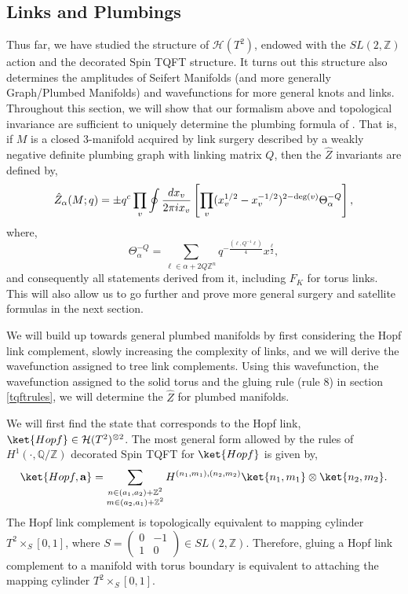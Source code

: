 \documentclass{article}
\newcommand{\Z}{{\mathbb Z}}
\newcommand{\Q}{{\mathbb Q}}
\def\be{\begin{equation}}
\def\ee{\end{equation}}
\numberwithin{corollary}{theorem}
\numberwithin{corollary}{proposition}
\begin{document}
\subsection{Links and Plumbings}
Thus far, we have studied the structure of $\mathcal{H}(T^2)$, endowed with the $SL(2,\mathbb{Z})$ action and the decorated $\mathrm{Spin}$ TQFT structure. It turns out this structure also determines the amplitudes of Seifert Manifolds (and more generally Graph/Plumbed Manifolds) and wavefunctions for more general knots and links. Throughout this section, we will show that our formalism above and topological invariance are sufficient to uniquely determine the plumbing formula of \cite{GPPV}. That is, if $M$ is a closed 3-manifold acquired by link surgery described by a weakly negative definite plumbing graph with linking matrix $Q$, then the $\hat{Z}$ invariants are defined by, 
\be \label{plumbingformula}\Hat{Z}_\alpha(M;q) = \pm q^c \prod_v\oint \frac{dx_v}{2\pi i x_v} \left[ \prod_v (x_v^{1/2} -x_v^{-1/2})^{2-\mathrm{deg}( v)} \Theta^{-Q}_\alpha  \right], \ee
where,
$$\Theta^{-Q}_\alpha = \sum_{\ell \in \alpha + 2Q\mathbb{Z}^n} q^{-\frac{( \ell,Q^{-1} \ell)}{4}} x^{\frac{\ell}{2}},$$
and consequently all statements derived from it, including $F_K$ for torus links. This will also allow us to go further and prove more general surgery and satellite formulas in the next section. 

We will build up towards general plumbed manifolds by first considering the Hopf link complement, slowly increasing the complexity of links, and we will derive the wavefunction assigned to tree link complements. Using this wavefunction, the wavefunction assigned to the solid torus and the gluing rule (rule 8) in section \ref{tqftrules}, we will determine the $\hat{Z}$ for plumbed manifolds. 

We will first find the state that corresponds to the Hopf link, $\ket{Hopf}\in \mathcal{H}(T^2)^{\otimes2}$. The most general form allowed by the rules of $H^{1}(\cdot,\Q/\Z)$ decorated $\mathrm{Spin}$ TQFT for $\ket{Hopf}$ is given by,
$$\ket{Hopf, \mathbf{a}} = \sum_{\substack{ n \in (a_{1}, a_{2}) + \Z^{2} \\ m \in (a_{2}, a_{1}) + \Z^{2} }}  H^{(n_1,m_1),(n_2,m_2)} \ket{n_1,m_1}\otimes\ket{n_2,m_2}.$$
The Hopf link complement is topologically equivalent to mapping cylinder $T^{2} \times_{S} [0,1] $, where $S = \begin{pmatrix}
    0 & -1 \\ 1 & 0
\end{pmatrix} \in SL(2,\Z)$. Therefore, gluing a Hopf link complement to a manifold with torus boundary is equivalent to attaching the mapping cylinder $T^{2} \times_{S} [0,1] $. 
\end{document}
